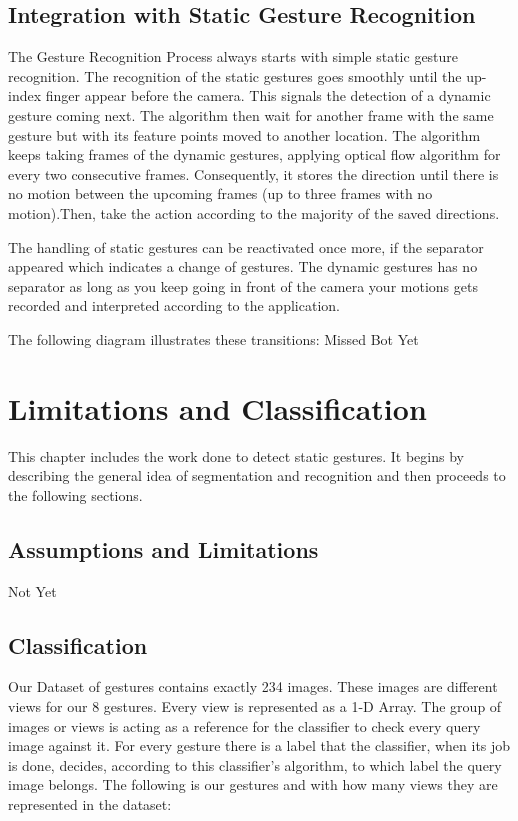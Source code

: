 \documentclass[12pt,fleqn]{book} %
\begin{document}
\subsection{Integration with Static Gesture Recognition}
The Gesture Recognition Process always starts with simple static gesture recognition. The recognition of the static gestures goes smoothly until the up-index finger appear before the camera. This signals the detection of a dynamic gesture coming next. The algorithm then wait for another frame with the same gesture but with its feature points moved to another location. The algorithm keeps taking frames of the dynamic gestures, applying optical flow algorithm for every two consecutive frames. Consequently, it stores the direction until there is no motion between the upcoming frames (up to three frames with no motion).Then, take the action according to the majority of the saved directions.\bigskip


The handling of static gestures can be reactivated once more, if the separator appeared which indicates a change of gestures. The dynamic gestures has no separator as long as you keep going in front of the camera your motions gets recorded and interpreted according to the application.\bigskip


The following diagram illustrates these transitions:
Missed Bot Yet

\section{Limitations and Classification}
This chapter includes the work done to detect static gestures. It begins by describing the general idea of segmentation and recognition and then proceeds to the following sections.\bigskip

\subsection{Assumptions and Limitations}
Not Yet \bigskip

\subsection{Classification} 
Our Dataset of gestures contains exactly 234 images. These images are different views for our 8 gestures. Every view is represented as a 1-D Array. The group of images or views is acting as a reference for the classifier to check every query image against it. For every gesture there is a label that the classifier, when its job is done, decides, according to this classifier’s algorithm, to which label the query image belongs. The following is our gestures and with how many views they are represented in the dataset:
\end{document}
